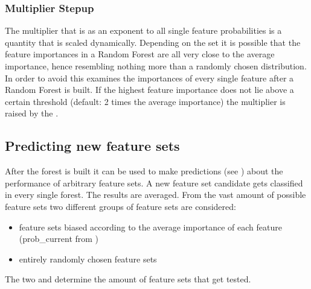 \documentclass[letterpaper,10pt,english]{sphinxmanual}
\begin{document}
\subsubsection{Multiplier Stepup}
\label{\detokenize{RF:multiplier-stepup}}
The multiplier that is {\hyperref[\detokenize{RF:multi}]{}} as an exponent to all single feature probabilities is a quantity that is scaled dynamically.
Depending on the {\hyperref[\detokenize{Overview:term-raw-data-set}]{}} set it is possible that the feature importances in a Random Forest are all very close to the average importance, hence resembling nothing more than a randomly chosen distribution.
In order to avoid this {\hyperref[\detokenize{Overview:term-forestfire}]{}} examines the importances of every single feature after a Random Forest is built.
If the highest feature importance does not lie above a certain threshold (default: 2 times the average importance) the multiplier is raised by the {\hyperref[\detokenize{execution:hyperparameters}]{}}.


\subsection{Predicting new feature sets}
\label{\detokenize{RF:pred-new}}\label{\detokenize{RF:predicting-new-feature-sets}}
After the forest is built it can be used to make predictions (see {\hyperref[\detokenize{RF:forest-predict}]{}}) about the performance of arbitrary feature sets.
A new feature set candidate gets classified in every single forest.
The results are averaged.
From the vast amount of possible feature sets two different groups of feature sets are considered:
\begin{itemize}
\item {} 
feature sets biased according to the average importance of each feature (prob\_current from {\hyperref[\detokenize{RF:update-prob}]{}})

\item {} 
entirely randomly chosen feature sets

\end{itemize}

The two {\hyperref[\detokenize{execution:hyperparameters}]{}}  and  determine the amount of feature sets that get tested.
\end{document}
